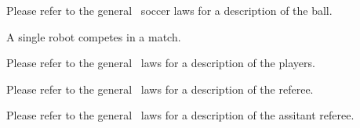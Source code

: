 \documentclass[12pt]{hurocup}
\begin{document}

Please refer to the general \HuroCup\ soccer laws for a description of
the ball.


\begin{lawlist}[PK]
\item A single robot competes in a match.
\end{lawlist}


Please refer to the general \HuroCup\ laws for a description of
the players.


Please refer to the general \HuroCup\ laws for a description of
the referee.


Please refer to the general \HuroCup\ laws for a description of
the assitant referee.
 
\end{document}

